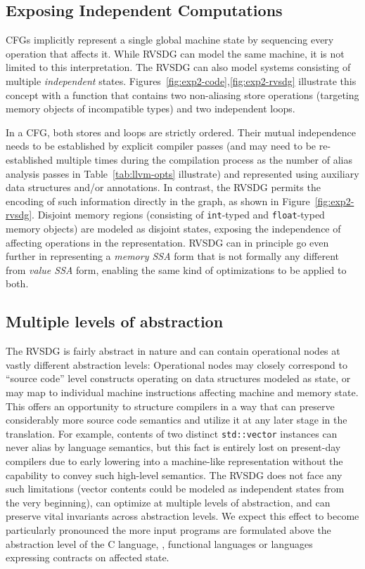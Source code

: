 \subsection{Exposing Independent Computations}

CFGs implicitly represent a single global machine state by sequencing every 
operation that affects it. While RVSDG can model the same machine,
it is not limited to this interpretation. %
The RVSDG can also model systems consisting of multiple
{\em independent} states. Figures~\ref{fig:exp2-code},\ref{fig:exp2-rvsdg}
illustrate this concept with a function that contains two non-aliasing store
operations (targeting memory objects of incompatible types) and two
independent loops.

In a CFG, both stores and loops are strictly ordered. Their
mutual independence needs to be established by explicit compiler passes (and
may need to be re-established multiple times during the compilation
process as the number of alias analysis passes in Table~\ref{tab:llvm-opts} illustrate)
and represented using auxiliary data structures and/or annotations. In
contrast, the RVSDG permits the encoding of such information directly in the graph, as shown in
Figure~\ref{fig:exp2-rvsdg}. Disjoint memory regions (consisting of {\tt int}-typed
and {\tt float}-typed memory objects) are modeled as disjoint states, exposing
the independence of affecting operations in the representation. RVSDG can
in principle go even further in representing a {\em memory SSA} form that is
not formally any different from {\em value SSA} form, enabling the same kind
of optimizations to be applied to both.

\subsection{Multiple levels of abstraction}

The RVSDG is fairly abstract in nature and can contain operational nodes at vastly
different abstraction levels: Operational nodes may closely correspond to ``source
code'' level constructs operating on data structures modeled as state, or may
map to individual machine instructions affecting machine and memory state. This
offers an opportunity to structure compilers in a way that can preserve
considerably more source code semantics and utilize it at any later stage in the
translation. For example, contents of two distinct {\tt std::vector} instances
can never alias by language semantics, but this fact is entirely lost on
present-day compilers due to early lowering into a machine-like representation
without the capability to convey such high-level semantics. The RVSDG does not face
any such limitations (vector contents could be modeled as independent states
from the very beginning), can optimize at multiple levels of abstraction,
and can preserve vital invariants across abstraction levels. We expect this effect to become
particularly pronounced the more input programs are formulated above the abstraction level
of the C language, \eg, functional languages or languages expressing contracts
on affected state.


